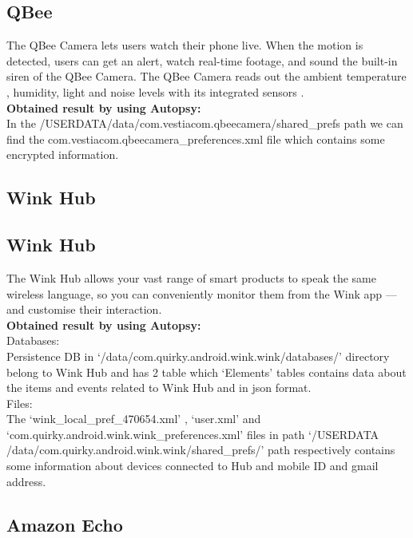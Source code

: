 \documentclass{easychair}
\begin{document}
\begin{enumerate}
\subsection{QBee}
The QBee Camera lets users watch their phone live. When the motion is detected, users can get an alert, watch real-time footage, and sound the built-in siren of the QBee Camera. The QBee Camera reads out the ambient temperature , humidity, light and noise levels with its integrated sensors \cite{pari_6}.\\

\textbf{Obtained result by using Autopsy:}\\

In the /USERDATA/data/com.vestiacom.qbeecamera/shared\_prefs path we can find the com.vestiacom.qbeecamera\_preferences.xml file which contains some encrypted information.\\

\subsection{Wink Hub}
\subsection{Wink Hub}
The Wink Hub allows your vast range of smart products to speak the same wireless language, so you can conveniently monitor them from the Wink app — and customise their interaction\cite{pari_7}.\\
\textbf{Obtained result by using Autopsy:}\\

Databases:\\
Persistence DB in ‘/data/com.quirky.android.wink.wink/databases/’ directory belong to Wink Hub and has 2 table which ‘Elements’ tables contains data about the items and events related to Wink Hub and in json format.\\

Files:\\
The ‘wink\_local\_pref\_470654.xml’ , ‘user.xml’ and ‘com.quirky.android.wink.wink\_preferences.xml’ files in path ‘/USERDATA /data/com.quirky.android.wink.wink/shared\_prefs/’ path respectively contains some information about devices connected to Hub and mobile ID and gmail address.\\

\subsection{Amazon Echo}

\end{enumerate}
\end{document}
